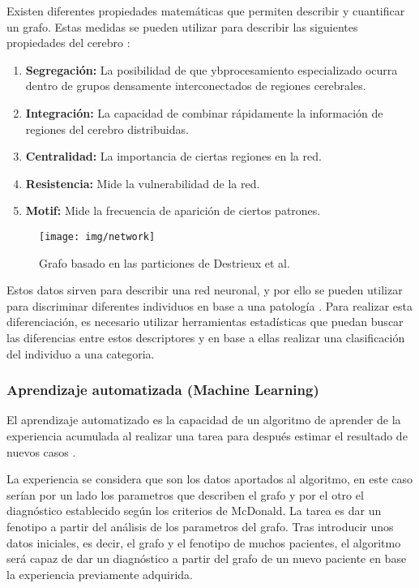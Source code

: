 \documentclass[fleqn,12pt]{UICArticle} %
\begin{document}
Existen diferentes propiedades matemáticas que permiten describir y cuantificar un grafo. Estas medidas se pueden utilizar para describir las siguientes propiedades del cerebro \cite{Rubinov2010}:
\begin{enumerate}[noitemsep]
\item \textbf{Segregación:} La posibilidad de que  ybprocesamiento especializado ocurra dentro de grupos densamente interconectados de regiones cerebrales.
\item \textbf{Integración:} La capacidad de combinar rápidamente la información de regiones del cerebro distribuidas.
\item \textbf{Centralidad:} La importancia de ciertas regiones en la red.
\item \textbf{Resistencia:} Mide la vulnerabilidad de la red.
\item \textbf{Motif:} Mide la frecuencia de aparición de ciertos patrones.
\end{enumerate}

\begin{figure}[p]
	\centering
	\texttt{[image: img/network]}
	\vspace{5mm} 
	\caption{Grafo basado en las particiones de Destrieux et al.\cite{Destrieux2010}}
	\label{fig:network}
\end{figure}

Estos datos sirven para describir una red neuronal, y por ello se pueden utilizar para discriminar diferentes individuos en base a una patología \cite{Muthuraman2016}. Para realizar esta diferenciación, es necesario utilizar herramientas estadísticas que puedan buscar las diferencias entre estos descriptores y en base a ellas realizar una clasificación del individuo a una categoria.


\subsubsection{Aprendizaje automatizada (Machine Learning)}

El aprendizaje automatizado es la capacidad de un algoritmo de aprender de la experiencia acumulada al realizar una tarea para después estimar el resultado de nuevos casos \cite{Friedman1997}.

La experiencia se considera que son los datos aportados al algoritmo, en este caso serían por un lado los parametros que describen el grafo y  por el otro el diagnóstico establecido según los criterios de McDonald. La tarea es dar un fenotipo a partir del análisis de los parametros del grafo. Tras introducir unos datos iniciales, es decir, el grafo y el fenotipo de muchos pacientes, el algoritmo será capaz de dar un diagnóstico a partir del grafo de un nuevo paciente en base la experiencia previamente adquirida.
\end{document}
